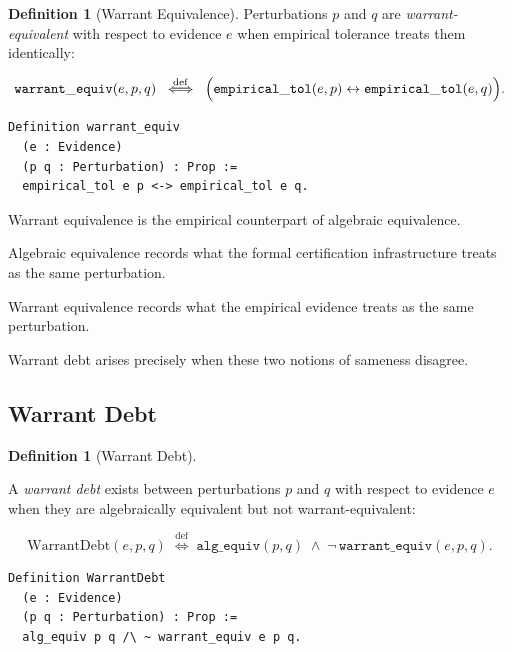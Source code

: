 \documentclass[12pt]{article}
\theoremstyle{plain}
\theoremstyle{definition}
\newtheorem{definition}[theorem]{Definition}
\theoremstyle{remark}
\newcommand{\WD}{\mathrm{WarrantDebt}}
\begin{document}
\begin{definition}[Warrant Equivalence]

Perturbations $p$ and $q$ are \emph{warrant-equivalent} with respect
to evidence $e$ when empirical tolerance treats them identically:

\[
\mathtt{warrant\_equiv}(e,p,q)
\;\stackrel{\mathrm{def}}{\iff}\;
\Bigl(
\mathtt{empirical\_tol}(e,p)
\leftrightarrow
\mathtt{empirical\_tol}(e,q)
\Bigr).
\]

\end{definition}

\begin{lstlisting}[style=rocq,
caption={Warrant equivalence.}]
Definition warrant_equiv
  (e : Evidence)
  (p q : Perturbation) : Prop :=
  empirical_tol e p <-> empirical_tol e q.
\end{lstlisting}

Warrant equivalence is the empirical counterpart of algebraic
equivalence.

Algebraic equivalence records what the formal certification
infrastructure treats as the same perturbation.

Warrant equivalence records what the empirical evidence treats as the
same perturbation.

Warrant debt arises precisely when these two notions of sameness
disagree.

\subsection{Warrant Debt}

\begin{definition}[Warrant Debt]
\label{def:warrant-debt}

A \emph{warrant debt} exists between perturbations $p$ and $q$ with
respect to evidence $e$ when they are algebraically equivalent but not
warrant-equivalent:

\[
\WD(e,p,q)
\;\stackrel{\mathrm{def}}{\iff}\;
\mathtt{alg\_equiv}(p,q)
\;\wedge\;
\neg\,\mathtt{warrant\_equiv}(e,p,q).
\]

\end{definition}

\begin{lstlisting}[style=rocq,
caption={Warrant debt.}]
Definition WarrantDebt
  (e : Evidence)
  (p q : Perturbation) : Prop :=
  alg_equiv p q /\ ~ warrant_equiv e p q.
\end{lstlisting}
\end{document}
